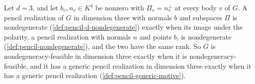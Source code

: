 \begin{lemma}
  \label{lem:pencil-d-nondegenerate-three}
  \leanok
  Let $d = 3$, and let $b_v, n_v \in K^4$ be nonzero with
  $\Pi_v = n_v^{\perp}$ at every body $v$ of $G$. A pencil realization of
  $G$ in dimension three with normals $b$ and subspaces $\Pi$ is
  nondegenerate (\cref{def:pencil-d-nondegenerate}) exactly when its
  image under the polarity, a pencil realization with normals $n$ and
  points $b$, is nondegenerate (\cref{def:pencil-nondegenerate}), and the
  two have the same rank. So $G$ is nondegeneracy-feasible in dimension
  three exactly when it is nondegeneracy-feasible, and it has a generic
  pencil realization in dimension three exactly when it has a generic
  pencil realization (\cref{def:pencil-generic-motive}).
\end{lemma}
